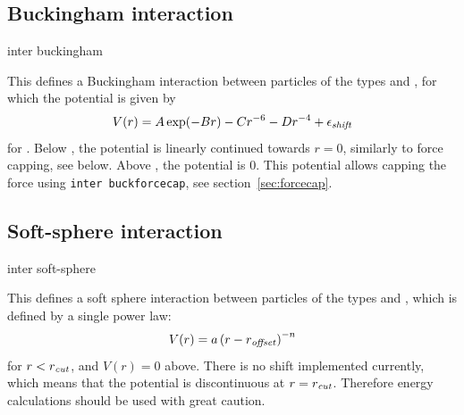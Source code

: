 \subsection{Buckingham interaction}

\begin{essyntax}
  inter   buckingham
     
    
  \begin{features}
  \end{features}
\end{essyntax}
This defines a Buckingham interaction between particles of the types
 and , for which the potential is given by
\begin{equation}
  V(r)= A\exp(-B r) - Cr^{-6} - Dr^{-4} + \epsilon_\text{\mbox{\textrm{\textit{shift}}}}
\end{equation}
for . Below ,
the potential is linearly continued towards $r=0$, similarly to force capping,
see below. Above , the potential is 0. This potential
allows capping the force using {\tt inter buckforcecap}, see
section~\ref{sec:forcecap}.

\subsection{Soft-sphere interaction}

\begin{essyntax}
  inter  
  soft-sphere    
  \begin{features}
  \end{features}
\end{essyntax}
This defines a soft sphere interaction between particles of the types
 and , which is defined by a single power law:
\begin{equation}
  V(r)=a\left(r-r_\text{\mbox{\textrm{\textit{offset}}}}\right)^{-n}
\end{equation}
for $r<r_\text{\mbox{\textrm{\textit{cut}}}}$, and $V(r)=0$ above. There is no shift implemented
currently, which means that the potential is discontinuous at
$r=r_\text{\mbox{\textrm{\textit{cut}}}}$. Therefore energy calculations should be used with great
caution.

